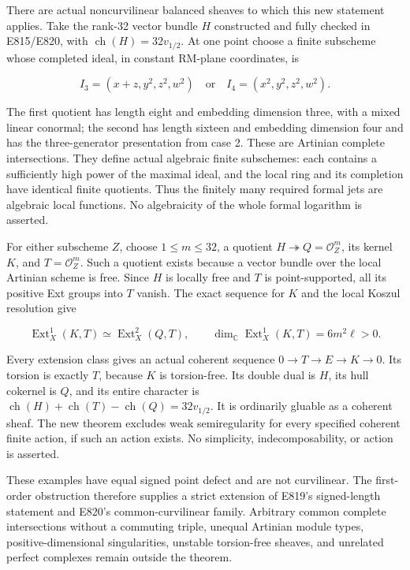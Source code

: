 There are actual noncurvilinear balanced sheaves to which this new
statement applies. Take the rank-32 vector bundle \(H\) constructed and
fully checked in E815/E820, with \(\operatorname{ch}(H)=32v_{1/2}\). At
one point choose a finite subscheme whose completed ideal, in constant
RM-plane coordinates, is

\[
 I_3=(x+z,y^2,z^2,w^2)
       \quad\text{or}\quad
 I_4=(x^2,y^2,z^2,w^2).
 \tag{E836.19}
\]

The first quotient has length eight and embedding dimension three, with
a mixed linear conormal; the second has length sixteen and embedding
dimension four and has the three-generator presentation from case 2.
These are Artinian complete intersections. They define actual algebraic
finite subschemes: each contains a sufficiently high power of the
maximal ideal, and the local ring and its completion have identical
finite quotients. Thus the finitely many required formal jets are
algebraic local functions. No algebraicity of the whole formal logarithm
is asserted.

For either subscheme \(Z\), choose \(1\le m\le32\), a quotient
\(H\twoheadrightarrow Q=\mathcal O_Z^m\), its kernel \(K\), and
\(T=\mathcal O_Z^m\). Such a quotient exists because a vector bundle
over the local Artinian scheme is free. Since \(H\) is locally free and
\(T\) is point-supported, all its positive Ext groups into \(T\) vanish.
The exact sequence for \(K\) and the local Koszul resolution give

\[
 \operatorname{Ext}^1_X(K,T)
   \simeq\operatorname{Ext}^2_X(Q,T),
 \qquad
 \dim_{\mathbb C}\operatorname{Ext}^1_X(K,T)=6m^2\ell>0.
 \tag{E836.20}
\]

Every extension class gives an actual coherent sequence
\(0\to T\to E\to K\to0\). Its torsion is exactly \(T\), because \(K\) is
torsion-free. Its double dual is \(H\), its hull cokernel is \(Q\), and
its entire character is
\(\operatorname{ch}(H)+\operatorname{ch}(T)-\operatorname{ch}(Q)=32v_{1/2}\).
It is ordinarily gluable as a coherent sheaf. The new theorem excludes
weak semiregularity for every specified coherent finite action, if such
an action exists. No simplicity, indecomposability, or action is
asserted.

These examples have equal signed point defect and are not curvilinear.
The first-order obstruction therefore supplies a strict extension of
E819's signed-length statement and E820's common-curvilinear family.
Arbitrary common complete intersections without a commuting triple,
unequal Artinian module types, positive-dimensional singularities,
unstable torsion-free sheaves, and unrelated perfect complexes remain
outside the theorem.

